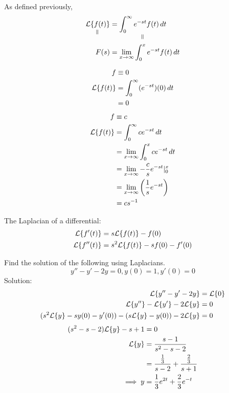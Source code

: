 \documentclass[diffeq.tex]{subfiles}
\begin{document}
    As defined previously,
    \begin{alignat*}{2} %
        \underset{\rotatebox{90}{$\,=$}}{\lp{f(t)}} &= \underset{\rotatebox{90}{$\,=$}}{\int_{0}^{\infty}e^{-st}f(t)\,dt}\\
        F(s) &= \lim_{x\to\infty}\int_{0}^{x}e^{-st}f(t)\,dt
    \end{alignat*}
    \begin{example}
        \begin{alignat}{1}
            f &\equiv 0\\
            \mathcal{L}\{f(t)\} &= \int_{0}^{\infty}(e^{-st})(0)\,dt\\
            &= 0
        \end{alignat}
        \begin{alignat}{1}
            f &\equiv c\\
            \mathcal{L}\{f(t)\} &= \int_{0}^{\infty}ce^{-st}\,dt\\
            &= \lim_{x\to\infty}\int_{0}^{x}ce^{-st}\,dt\\
            &= \lim_{x\to\infty}-\frac{c}{s}e^{-st}|_{0}^{x}\\
            &= \lim_{x\to\infty}\left(\frac{1}{s}e^{-st}\right)\\
            &= cs^{-1}
        \end{alignat}
    \end{example}
    \begin{btheorem}
        The Laplacian of a differential:
        \begin{alignat}{1}
            \mathcal{L}\{f'(t)\} &= s\mathcal{L}\{f(t)\} - f(0)\\
            \mathcal{L}\{f''(t)\} &= s^{2}\mathcal{L}\{f(t)\}-sf(0)-f'(0)
        \end{alignat}
    \end{btheorem}
    \begin{example}
        Find the solution of the following using Laplacians.
        \begin{equation}
            y'' - y' -2y = 0, y(0) = 1, y'(0) = 0
        \end{equation}
        Solution:
        \begin{alignat}{1}
            \mathcal{L}\{y'' - y' - 2y\} &= \mathcal{L}\{0\}\\
            \mathcal{L}\{y''\} - \mathcal{L}\{y'\} - 2\mathcal{L}\{y\} &= 0\\
            (s^{2}\mathcal{L}\{y\} - sy(0) - y'(0)) - (s\mathcal{L}\{y\} - y(0)) - 2\mathcal{L}\{y\} &= 0
        \end{alignat}
        \begin{alignat}{1}
            (s^{2} - s - 2)\mathcal{L}\{y\} - s + 1 &= 0\\
            \mathcal{L}\{y\} &= \frac{s - 1}{s^{2} - s - 2}\\
            &= \frac{\frac{1}{3}}{s-2} + \frac{\frac{2}{3}}{s+1}\\
            \implies y &= \frac{1}{3}e^{2t} + \frac{2}{3}e^{-t}
        \end{alignat}
    \end{example}
\end{document}
